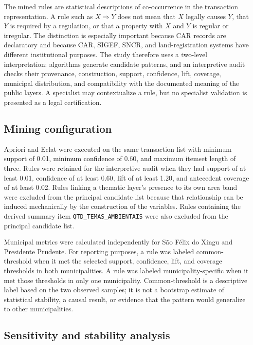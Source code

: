 \documentclass[11pt]{article}
\begin{document}
The mined rules are statistical descriptions of co-occurrence in the transaction representation. A rule such as $X \Rightarrow Y$ does not mean that $X$ legally causes $Y$, that $Y$ is required by a regulation, or that a property with $X$ and $Y$ is regular or irregular. The distinction is especially important because CAR records are declaratory and because CAR, SIGEF, SNCR, and land-registration systems have different institutional purposes. The study therefore uses a two-level interpretation: algorithms generate candidate patterns, and an interpretive audit checks their provenance, construction, support, confidence, lift, coverage, municipal distribution, and compatibility with the documented meaning of the public layers. A specialist may contextualize a rule, but no specialist validation is presented as a legal certification.

\subsection{Mining configuration}

Apriori and Eclat were executed on the same transaction list with minimum support of 0.01, minimum confidence of 0.60, and maximum itemset length of three. Rules were retained for the interpretive audit when they had support of at least 0.01, confidence of at least 0.60, lift of at least 1.20, and antecedent coverage of at least 0.02. Rules linking a thematic layer's presence to its own area band were excluded from the principal candidate list because that relationship can be induced mechanically by the construction of the variables. Rules containing the derived summary item \texttt{QTD\_TEMAS\_AMBIENTAIS} were also excluded from the principal candidate list.

Municipal metrics were calculated independently for São Félix do Xingu and Presidente Prudente. For reporting purposes, a rule was labeled common-threshold when it met the selected support, confidence, lift, and coverage thresholds in both municipalities. A rule was labeled municipality-specific when it met those thresholds in only one municipality. Common-threshold is a descriptive label based on the two observed samples; it is not a bootstrap estimate of statistical stability, a causal result, or evidence that the pattern would generalize to other municipalities.

\subsection{Sensitivity and stability analysis}
\end{document}
